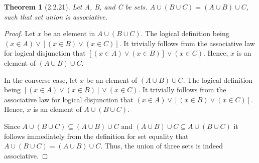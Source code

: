 \documentclass[a4paper, 12pt]{article}
\theoremstyle{plain}
\newtheorem*{theorem*}{Theorem}
\begin{document}
	
	\begin{theorem*}[2.2.21]
		Let A, B, and C be sets. $A \cup (B \cup C) = (A \cup B) \cup C$, such that set union is associative.
	\end{theorem*}
	
	\begin{proof}
		Let $x$ be an element in $A \cup (B \cup C)$. The logical definition being \newline $(x \in A) \lor [(x \in B) \lor (x \in C)]$. It trivially follows from the associative law for logical disjunction that $[(x \in A) \lor (x \in B)] \lor (x \in C)$. Hence, $x$ is an element of $(A \cup B) \cup C$.
		
		In the converse case, let $x$ be an element of $(A \cup B) \cup C$. The logical definition being $[(x \in A) \lor (x \in B)] \lor (x \in C)$. It trivially follows from the associative law for logical disjunction that $(x \in A) \lor [(x \in B) \lor (x \in C)]$. Hence, $x$ is an element of $A \cup (B \cup C) $.
		
		Since $A \cup (B \cup C) \subseteq (A \cup B) \cup C$ and $(A \cup B) \cup C \subseteq A \cup (B \cup C)$ it follows immediately from the definition for set equality that \newline $A \cup (B \cup C) = (A \cup B) \cup C$. Thus, the union of three sets is indeed associative.
	\end{proof}
\end{document}
